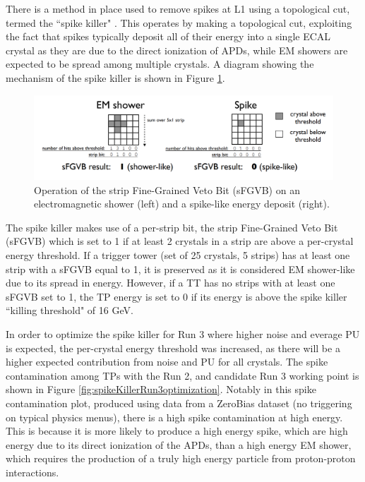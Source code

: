 There is a method in place used to remove spikes at L1 using a topological cut, termed the ``spike killer" \cite{Petyt_2012}. This operates by making a topological cut, exploiting the fact that spikes typically deposit all of their energy into a single ECAL crystal as they are due to the direct ionization of APDs, while EM showers are expected to be spread among multiple crystals. A diagram showing the mechanism of the spike killer is shown in Figure \ref{fig:spikeKillerDiagram}. 

\begin{figure}[H]
    \centering
    \includegraphics[width=\textwidth]{Images/ECAL/DW/SpikeKillerDiagram.png}
    \caption{Operation of the strip Fine-Grained Veto Bit (sFGVB) on an electromagnetic shower (left) and a spike-like energy deposit (right).}
    \label{fig:spikeKillerDiagram}
\end{figure}

The spike killer makes use of a per-strip bit, the strip Fine-Grained Veto Bit (sFGVB) which is set to 1 if at least 2 crystals in a strip are above a per-crystal energy threshold. If a trigger tower (set of 25 crystals, 5 strips) has at least one strip with a sFGVB equal to 1, it is preserved as it is considered EM shower-like due to its spread in energy. However, if a TT has no strips with at least one sFGVB set to 1, the TP energy is set to 0 if its energy is above the spike killer ``killing threshold" of 16 GeV. 

In order to optimize the spike killer for Run 3 where higher noise and everage PU is expected, the per-crystal energy threshold was increased, as there will be a higher expected contribution from noise and PU for all crystals. The spike contamination among TPs with the Run 2, and candidate Run 3 working point is shown in Figure \ref{fig:spikeKillerRun3optimization}. Notably in this spike contamination plot, produced using data from a ZeroBias dataset (no triggering on typical physics menus), there is a high spike contamination at high energy. This is because it is more likely to produce a high energy spike, which are high energy due to its direct ionization of the APDs, than a high energy EM shower, which requires the production of a truly high energy particle from proton-proton interactions. 

